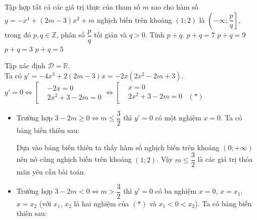 \begin{ex}%
 Tập hợp tất cả các giá trị thực của tham số $m$ sao cho hàm số $y=-x^4+(2m-3)x^2+m$ nghịch biến trên khoảng $(1;2)$ là $\left(-\infty;\dfrac{p}{q}\right]$, trong đó $p,q\in\mathbb{Z}$, phân số $\dfrac{p}{q}$ tối giản và $q>0$. Tính $p+q$.
 \choice
  {\True $p+q=7$}
  {$p+q=9$}
  {$p+q=3$}
  {$p+q=5$}
 \loigiai
  {
  Tập xác định $\mathscr{D}=\mathbb{R}$.\\
  Ta có $y' = -4x^3 + 2(2m-3)x = -2x(2x^2 - 2m + 3)$.\\
  $y' = 0 \Leftrightarrow \left[\begin{aligned} & -2x = 0 \\& 2x^2 + 3-2m = 0\end{aligned}\right. \Leftrightarrow \left[\begin{aligned} & x = 0 \\& 2x^2 + 3-2m = 0 & (*)\end{aligned}\right.$
  \begin{itemize}
   \item Trường hợp $3-2m \geq 0 \Leftrightarrow m \leq \dfrac{3}{2}$ thì $y'=0$ có một nghiệm $x=0$. Ta có bảng biến thiên sau:
   \begin{center}
   \end{center}
   Dựa vào bảng biến thiên ta thấy hàm số nghịch biến trên khoảng $(0;+\infty)$ nên nó cũng nghịch biến trên khoảng $(1;2)$. Vậy $m \leq \dfrac{3}{2}$ là các giá trị thỏa mãn yêu cầu bài toán.
   \item Trường hợp $3-2m < 0 \Leftrightarrow m > \dfrac{3}{2}$ thì $y'=0$ có ba nghiệm $x=0$, $x=x_1$, $x=x_2$ (với $x_1$, $x_2$ là hai nghiệm của $(*)$ và $x_1<0<x_2$). Ta có bảng biến thiên sau:
   \begin{center}
   \end{center}

\end{itemize}}
\end{ex}

